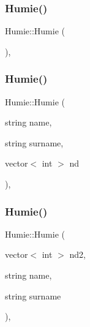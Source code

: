 \mbox{\label{class_humie_a9a042aaece31359fe6fed36471e6c45a}} 
\subsubsection{\texorpdfstring{Humie()}{Humie()}\hspace{0.1cm}{\footnotesize\ttfamily [4/6]}}
{\footnotesize\ttfamily Humie\+::\+Humie (\begin{DoxyParamCaption}{ }\end{DoxyParamCaption})\hspace{0.3cm}{\ttfamily [inline]}, {\ttfamily [protected]}}

\mbox{\label{class_humie_a967215f261774cb74388be0134186a15}} 
\subsubsection{\texorpdfstring{Humie()}{Humie()}\hspace{0.1cm}{\footnotesize\ttfamily [5/6]}}
{\footnotesize\ttfamily Humie\+::\+Humie (\begin{DoxyParamCaption}\item[{string}]{name,  }\item[{string}]{surname,  }\item[{vector$<$ int $>$}]{nd }\end{DoxyParamCaption})\hspace{0.3cm}{\ttfamily [inline]}, {\ttfamily [protected]}}

\mbox{\label{class_humie_af7aee344bf24bb787e59eeaae287c228}} 
\subsubsection{\texorpdfstring{Humie()}{Humie()}\hspace{0.1cm}{\footnotesize\ttfamily [6/6]}}
{\footnotesize\ttfamily Humie\+::\+Humie (\begin{DoxyParamCaption}\item[{vector$<$ int $>$}]{nd2,  }\item[{string}]{name,  }\item[{string}]{surname }\end{DoxyParamCaption})\hspace{0.3cm}{\ttfamily [inline]}, {\ttfamily [protected]}}



